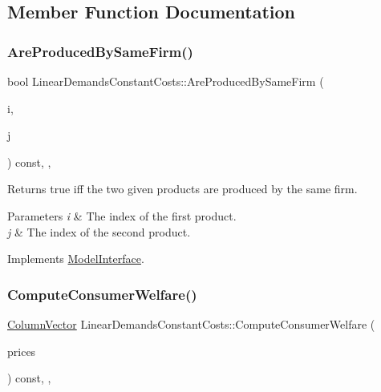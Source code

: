 \subsection{Member Function Documentation}
\mbox{\label{classLinearDemandsConstantCosts_a91ba117b740d0e5cb5d6efd63d61a5f6}} 
\subsubsection{\texorpdfstring{Are\+Produced\+By\+Same\+Firm()}{AreProducedBySameFirm()}}
{\footnotesize\ttfamily bool Linear\+Demands\+Constant\+Costs\+::\+Are\+Produced\+By\+Same\+Firm (\begin{DoxyParamCaption}\item[{int}]{i,  }\item[{int}]{j }\end{DoxyParamCaption}) const\hspace{0.3cm}{\ttfamily [final]}, {\ttfamily [override]}, {\ttfamily [virtual]}}

Returns true iff the two given products are produced by the same firm.


\begin{DoxyParams}{Parameters}
{\em i} & The index of the first product. \\
\hline
{\em j} & The index of the second product. \\
\hline
\end{DoxyParams}


Implements \hyperlink{classModelInterface_abbc3c44c6d41b596b6201a9e61e1ff83}{Model\+Interface}.

\mbox{\label{classLinearDemandsConstantCosts_a9d3fa6a3b151c2f1703f23bbee6954cb}} 
\subsubsection{\texorpdfstring{Compute\+Consumer\+Welfare()}{ComputeConsumerWelfare()}}
{\footnotesize\ttfamily \hyperlink{classColumnVector}{Column\+Vector} Linear\+Demands\+Constant\+Costs\+::\+Compute\+Consumer\+Welfare (\begin{DoxyParamCaption}\item[{\hyperlink{classColumnVector}{Column\+Vector} const \&}]{prices }\end{DoxyParamCaption}) const\hspace{0.3cm}{\ttfamily [final]}, {\ttfamily [override]}, {\ttfamily [virtual]}}

